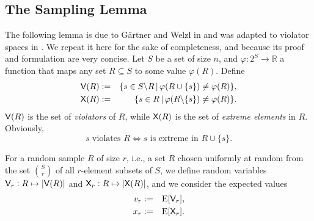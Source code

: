 \documentclass[12pt]{article}
\def\Exp{\qopname\relax m{E}}
\def\Violators{{\sf V}}
\def\Extremes{{\sf X}}
\theoremstyle{remark}
\begin{document}
\subsection{The Sampling Lemma}
The following lemma is due to G\"artner and Welzl in 
\cite{GWSampl01} and was adapted to violator
spaces in \cite{journals/dam/GartnerMRS08}. We repeat it here for the sake
of completeness, and because its proof and formulation are very
concise.
Let $S$ be a set of size $n$, and $\varphi: 2^S\rightarrow \mathbb{R}$  a function that maps any
set $R\subseteq S$ to some value $\varphi(R)$. Define
\begin{eqnarray}
	\Violators(R) &:=& \{ s\in S\backslash R \,|\, \varphi(R\cup \{s\}) \neq \varphi(R)\}, \label{def:violator}\\
	\Extremes(R) &:=& \{s\in R \,|\, \varphi(R\backslash\{s\})\neq \varphi(R)\}\label{def:extreme}.
\end{eqnarray}
$\Violators(R)$ is the set of \emph{violators} of $R$, while
$\Extremes(R)$ is the set of \emph{extreme elements} in $R$. Obviously,
\begin{equation}
	s \mbox{ violates } R \Leftrightarrow s \mbox{ is extreme in } R\cup\{s\}.\label{eqViolators}
\end{equation}

For a random sample $R$ of size $r$, i.e., a set $R$ chosen uniformly at random from the set ${S 
\choose r}$ of all $r$-element subsets of $S$, we define random variables $\Violators_r: R \mapsto |
\Violators(R)|$ and
$\Extremes_r: R \mapsto |\Extremes(R)|$, and we consider the expected values
\begin{eqnarray*}
	v_r &:=& \Exp[\Violators_r],\\
	x_r &:=& \Exp[\Extremes_r].
\end{eqnarray*}
\end{document}
